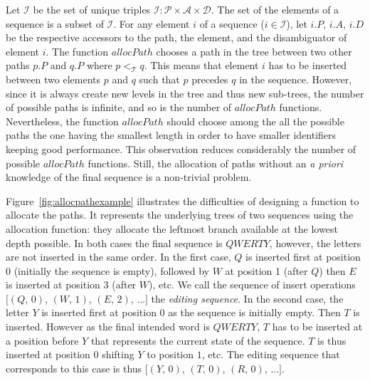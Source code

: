 Let $\mathcal{I}$ be the set of unique triples
$\mathcal{I}: \mathcal{P}\times\mathcal{A}\times\mathcal{D}$. The set of the
elements of a sequence is a subset of $\mathcal{I}$. For any element $i$ of a
sequence ($i \in \mathcal{I}$), let $i.P$, $i.A$, $i.D$ be the respective
accessors to the path, the element, and the disambiguator of element $i$. The
function $allocPath$ chooses a path in the tree between two other paths $p.P$
and $q.P$ where $p<_{\mathcal{T}}q$. This means that element $i$ has to be
inserted between two elements $p$ and $q$ such that $p$ precedes $q$ in the
sequence. However, since it is always create new levels in the tree and thus
new sub-trees, the number of possible paths is infinite, and so is the number
of $allocPath$ functions. Nevertheless, the function $allocPath$ should choose
among the all the possible paths the one having the smallest length in order to
have smaller identifiers keeping good performance. This observation reduces
considerably the number of possible $allocPath$ functions. Still, the
allocation of paths without an \emph{a priori} knowledge of the final sequence
is a non-trivial problem.

\begin{figure*}
  \centering
  \hspace{50pt}
  \caption{\label{fig:allocpathexample} Two trees filled with the resulting
    identifiers of two different permutations resulting in an identical
    sequence $QWERTY$. They use the same function $allocPath$ which allocates
    the leftmost branch in the tree. All paths of the nearly optimal case have
    a length of 1 while the tree of the worst case grows up to a depth of 6.}
\end{figure*}

Figure~\ref{fig:allocpathexample} illustrates the difficulties of designing a
function to allocate the paths. It represents the underlying trees of two
sequences using the allocation function: they allocate the leftmost branch
available at the lowest depth possible. In both cases the final sequence is
$QWERTY$, however, the letters are not inserted in the same order. In the first
case, $Q$ is inserted first at position 0 (initially the sequence is empty),
followed by $W$ at position 1 (after $Q$) then $E$ is inserted at position 3
(after $W$), etc. We call the sequence of insert operations $[(Q,\,0)$,
$(W,\,1)$, $(E,\,2)$, $\ldots]$ the \emph{editing sequence}. In the second
case, the letter $Y$ is inserted first at position 0 as the sequence is
initially empty. Then $T$ is inserted. However as the final intended word is
$QWERTY$, $T$ has to be inserted at a position before $Y$ that represents the
current state of the sequence. $T$ is thus inserted at position 0 shifting $Y$
to position $1$, etc. The editing sequence that corresponds to this case
is thus $[(Y,\,0)$, $(T,\,0)$, $(R,\,0)$, $\ldots]$.



